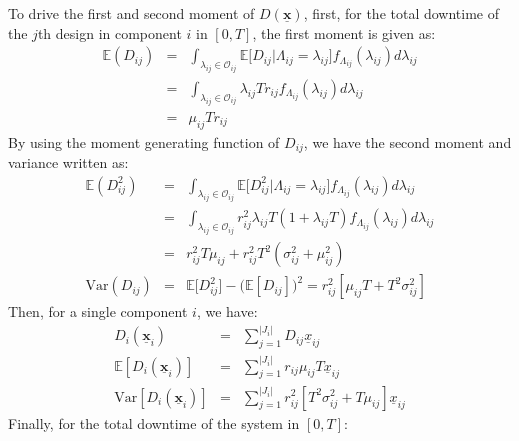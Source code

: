 \documentclass[preprint,12pt]{elsarticle}
\begin{document}
To drive the first and second moment of $D(\boldsymbol{\underline{x}})$, first, for the total downtime of the $j$th design in component $i$ in $[0, T]$, the first moment is given as:
\small
\begin{eqnarray}
\mathbb{E}(D_{ij}) &=& \int_{\lambda_{ij}\in \mathcal O_{ij}}\mathbb{E}\bigg[D_{ij} \bigg\vert \Lambda_{ij}=\lambda_{ij}\bigg]f_{\Lambda_{ij}}(\lambda_{ij})d\lambda_{ij} \nonumber\\
 &=& \int_{\lambda_{ij}\in \mathcal O_{ij} } \lambda_{ij}T r_{ij}f_{\Lambda_{ij}}(\lambda_{ij})d\lambda_{ij} \nonumber\\
 &=& \mu_{ij} T r_{ij}
\end{eqnarray}
By using the moment generating function of $D_{ij}$, we have the second moment and variance written as:
\begin{eqnarray}
\mathbb{E}(D^{2}_{ij}) &=& \int_{\lambda_{ij}\in \mathcal O_{ij}}\mathbb{E}\bigg[D^{2}_{ij} \bigg\vert \Lambda_{ij}=\lambda_{ij}\bigg]f_{\Lambda_{ij}}(\lambda_{ij})d\lambda_{ij}  \nonumber\\
&=& \int_{\lambda_{ij}\in \mathcal O_{ij}} {r^{2}_{ij}\lambda_{ij}T(1+\lambda_{ij}T)f_{\Lambda_{ij}}(\lambda_{ij})d\lambda_{ij}} \nonumber\\
&=& r^{2}_{ij}T\mu_{ij} + r^{2}_{ij}T^{2}(\sigma^{2}_{ij}+\mu^{2}_{ij}) \\
\textrm{Var}(D_{ij})&=&\mathbb{E}\bigg[D^{2}_{ij}\bigg] - \bigg(\mathbb{E}[D_{ij}]\bigg)^{2}=r^{2}_{ij}[\mu_{ij}T + T^{2}\sigma^{2}_{ij}]
\end{eqnarray}
\normalsize
Then, for a single component $i$, we have:
\small
\begin{eqnarray}
D_{i}(\boldsymbol{\underline{x}}_{i}) &=& \sum_{j=1}^{\lvert J_{i}\rvert}{D_{ij}\underline{x}_{ij}}\\
\mathbb{E}[D_{i}(\boldsymbol{\underline{x}}_{i})] &=&\sum_{j=1}^{\lvert J_{i} \rvert}{r_{ij}\mu_{ij}T\underline{x}_{ij}} \\
\textrm{Var}[D_{i}(\boldsymbol{\underline{x}}_{i})]&=&\sum_{j=1}^{\lvert J_{i} \rvert}{r_{ij}^{2}[T^{2}\sigma^{2}_{ij}+T\mu_{ij}]\underline{x}_{ij}}
\end{eqnarray}
\normalsize
Finally, for the total downtime of the system in $[0, T]$:
\small
\end{document}
